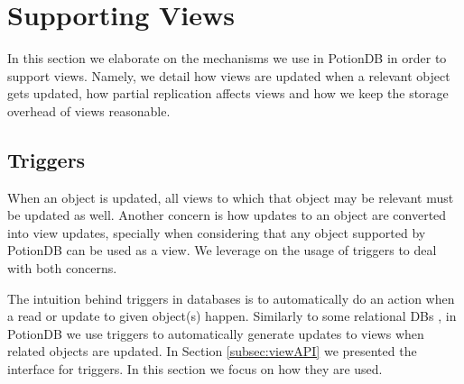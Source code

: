 \documentclass{vldb}
\newcommand{\grumbler}[2]{{\color{red}{\bf #1:} #2}}
\renewcommand{\grumbler}[2]{}
\newcommand{\andre}[1]{\grumbler{andre}{#1}}
\begin{document}

\section{Supporting Views}
\label{sec:views}

\andre{I ended up not mentioning the challenges of supporting views, but let me know if I should fit those somehow}

In this section we elaborate on the mechanisms we use in PotionDB in order to support views.
Namely, we detail how views are updated when a relevant object gets updated, how partial replication affects views and how we keep the storage overhead of views reasonable.

%

\subsection{Triggers}
\andre{Please check for repetition/overlap with section \ref{subsec:viewAPI}}

When an object is updated, all views to which that object may be relevant must be updated as well.
Another concern is how updates to an object are converted into view updates, specially when considering that any object supported by PotionDB can be used as a view.
We leverage on the usage of triggers to deal with both concerns.

The intuition behind triggers in databases is to automatically do an action when a read or update to given object(s) happen.
Similarly to some relational DBs \cite{???}, in PotionDB we use triggers to automatically generate updates to views when related objects are updated.
In Section \ref{subsec:viewAPI} we presented the interface for triggers. In this section we focus on how they are used.
\end{document}

